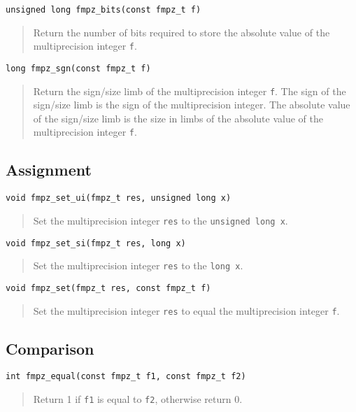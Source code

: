 \documentclass[a4paper,10pt]{article}
\newcommand{\code}{\lstinline}
\begin{document}
\begin{lstlisting}
unsigned long fmpz_bits(const fmpz_t f)
\end{lstlisting}
\begin{quote}
Return the number of bits required to store the absolute value of the multiprecision integer \code{f}.
\end{quote}

\begin{lstlisting}
long fmpz_sgn(const fmpz_t f)
\end{lstlisting}
\begin{quote}
Return the sign/size limb of the multiprecision integer \code{f}. The sign of the sign/size limb is the sign of the multiprecision integer. The absolute value of the sign/size limb is the size in limbs of the absolute value of the multiprecision integer \code{f}. 
\end{quote}

\subsection{Assignment}

\begin{lstlisting}
void fmpz_set_ui(fmpz_t res, unsigned long x)
\end{lstlisting}
\begin{quote}
Set the multiprecision integer \code{res} to the \code{unsigned long x}.
\end{quote}

\begin{lstlisting}
void fmpz_set_si(fmpz_t res, long x)
\end{lstlisting}
\begin{quote}
Set the multiprecision integer \code{res} to the \code{long x}.
\end{quote}

\begin{lstlisting}
void fmpz_set(fmpz_t res, const fmpz_t f)
\end{lstlisting}
\begin{quote}
Set the multiprecision integer \code{res} to equal the multiprecision integer \code{f}.
\end{quote}

\subsection{Comparison}

\begin{lstlisting}
int fmpz_equal(const fmpz_t f1, const fmpz_t f2)
\end{lstlisting}
\begin{quote}
Return 1 if \code{f1} is equal to \code{f2}, otherwise return 0.
\end{quote}
\end{document}
